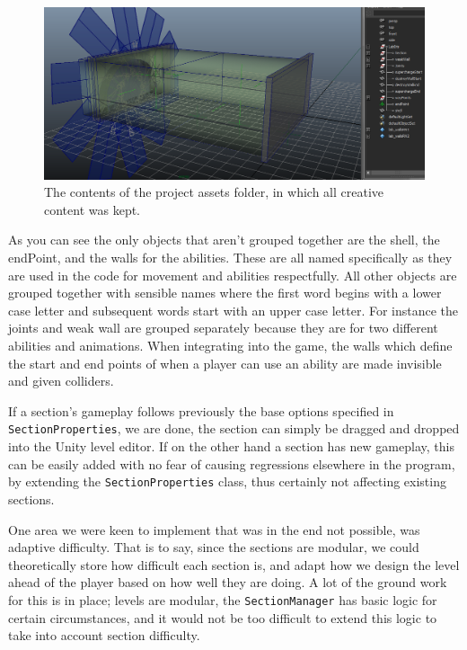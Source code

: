 \documentclass[a4paper,oneside]{memoir}
\begin{document}
			\begin{figure}[ht]
				\begin{center}
					\includegraphics[width=150mm]{"../Screenshots/iris-door-section"}
					\caption{The contents of the project assets folder, in which all creative content was kept.}
					\label{fig:IrisDoor}
				\end{center}
			\end{figure}

			As you can see the only objects that aren't grouped together are the shell, the endPoint, and the walls for the abilities.
			These are all named specifically as they are used in the code for movement and abilities respectfully. 
			All other objects are grouped together with sensible names where the first word begins with a lower case letter and subsequent words start with an upper case letter.
			For instance the joints and weak wall are grouped separately because they are for two different abilities and animations.
			When integrating into the game, the walls which define the start and end points of when a player can use an ability are made invisible and given colliders.

			If a section's gameplay follows previously the base options specified in \texttt{SectionProperties}, we are done, the section can simply be dragged and dropped into the Unity level editor. If on the other hand a section has new gameplay, this can be easily added with no fear of causing regressions elsewhere in the program, by extending the \texttt{SectionProperties} class, thus certainly not affecting existing sections.

			One area we were keen to implement that was in the end not possible, was adaptive difficulty. 
			That is to say, since the sections are modular, we could theoretically store how difficult each section is, and adapt how we design the level ahead of the player based on how well they are doing.
			A lot of the ground work for this is in place; levels are modular, the \texttt{SectionManager} has basic logic for certain circumstances, and it would not be too difficult to extend this logic to take into account section difficulty.
\end{document}
